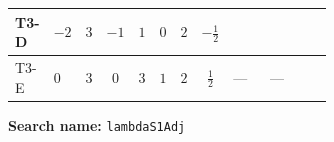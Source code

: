 \documentclass[8pt]{article}
\begin{document}
\begin{landscape}
\begin{longtable}{@{}llcccccc >{\raggedright\arraybackslash}p{0.21\linewidth} >{\raggedright\arraybackslash}p{0.21\linewidth} >{\raggedright\arraybackslash}p{0.21\linewidth}@{}}
T3-D & $-2$ & $3$ & $-1$ & $1$ & $0$ & $2$ & $-\frac{1}{2}$ & \scriptsize\adjustbox{max width=\linewidth}{$\begin{gathered} +\frac{3 {g_Y}^4}{2}\end{gathered}$} & \scriptsize\adjustbox{max width=\linewidth}{$\begin{gathered} +\frac{{\lambda_{12}}^2}{4}\end{gathered}$} & \scriptsize\adjustbox{max width=\linewidth}{$\begin{gathered} +\frac{{\lambda_{H1}}^2}{2}\end{gathered}$} \\
\midrule
T3-E & $0$ & $3$ & $0$ & $3$ & $1$ & $2$ & $\frac{1}{2}$ & --- & --- & \scriptsize\adjustbox{max width=\linewidth}{$\begin{gathered} +\frac{{\lambda_{H1}}^2}{2}\end{gathered}$} \\
\midrule
\bottomrule
\end{longtable}
\clearpage
\noindent\textbf{Search name: }\texttt{lambdaS1Adj}\par\smallskip

\end{landscape}
\end{document}
